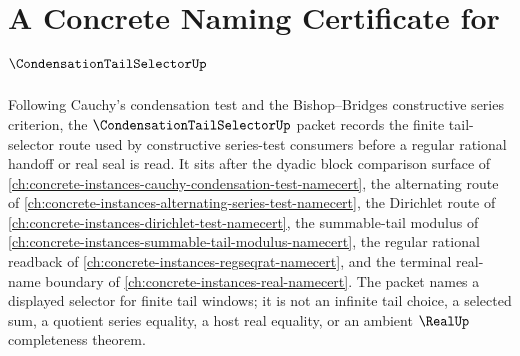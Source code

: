 \chapter{A Concrete Naming Certificate for $\CondensationTailSelectorUp$}
\label{ch:concrete-instances-condensation-tail-selector-namecert}

Following Cauchy's condensation test and the Bishop--Bridges constructive series criterion, the $\CondensationTailSelectorUp$ packet records the finite tail-selector route used by constructive series-test consumers before a regular rational handoff or real seal is read. It sits after the dyadic block comparison surface of \autoref{ch:concrete-instances-cauchy-condensation-test-namecert}, the alternating route of \autoref{ch:concrete-instances-alternating-series-test-namecert}, the Dirichlet route of \autoref{ch:concrete-instances-dirichlet-test-namecert}, the summable-tail modulus of \autoref{ch:concrete-instances-summable-tail-modulus-namecert}, the regular rational readback of \autoref{ch:concrete-instances-regseqrat-namecert}, and the terminal real-name boundary of \autoref{ch:concrete-instances-real-namecert}. The packet names a displayed selector for finite tail windows; it is not an infinite tail choice, a selected sum, a quotient series equality, a host real equality, or an ambient $\RealUp$ completeness theorem.

